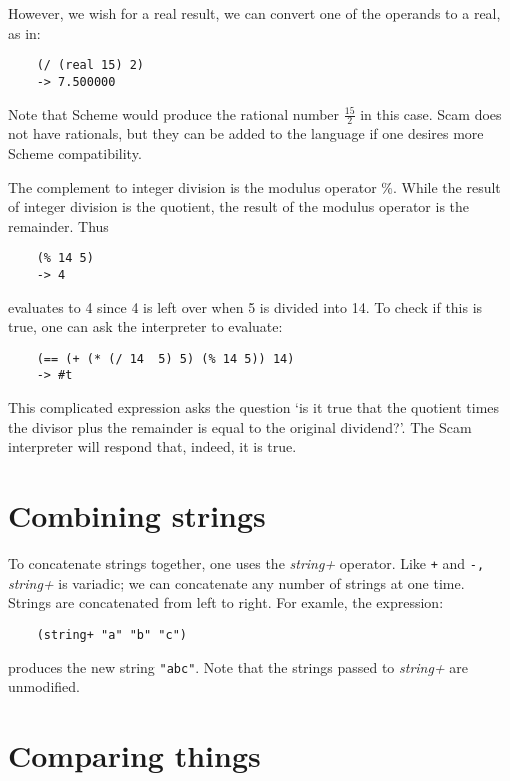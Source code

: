 However, we wish for a real result, we can convert one of
the operands to a real, as in:

\begin{verbatim}
    (/ (real 15) 2)
    -> 7.500000
\end{verbatim}

Note that Scheme would produce the rational number $\frac{15}{2}$ in this
case. Scam does not have rationals, but they can be added to
the language if one desires more Scheme compatibility.

The complement to integer division is the modulus operator \%. While the
result of integer division is the quotient, the result of the modulus
operator is the remainder. Thus

\begin{verbatim}
    (% 14 5)
    -> 4
\end{verbatim}

evaluates to 4 since 4 is left over when 5 is divided into 14. To check
if this is true, one can ask the interpreter to evaluate:

\begin{verbatim}
    (== (+ (* (/ 14  5) 5) (% 14 5)) 14)
    -> #t
\end{verbatim}

This complicated expression asks the question `is it true that the
quotient times the divisor plus the remainder is equal to the original
dividend?'. The Scam interpreter will respond that, indeed, it is
true. 

\section{Combining strings}

To concatenate strings together, one uses the {\it string+} operator.
Like \verb!+! and \verb!-,! {\it string+} is variadic;
we can concatenate any number of
strings at one time. Strings are concatenated from left to right.
For examle, the expression:

\begin{verbatim}
    (string+ "a" "b" "c")
\end{verbatim}

produces the new string \verb!"abc"!. Note that the strings passed
to {\it string+} are
unmodified.

\section{Comparing things}

